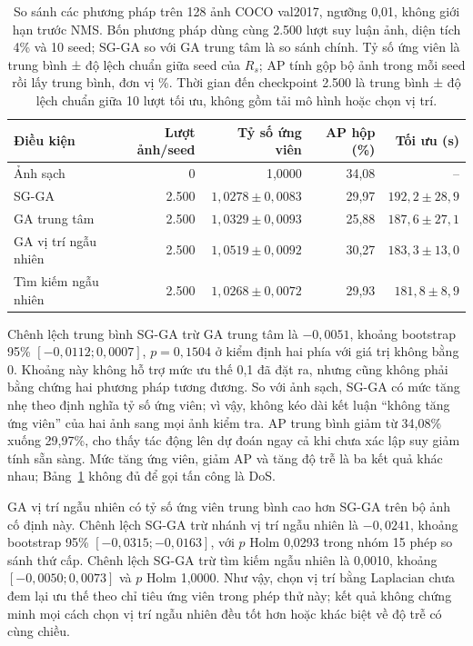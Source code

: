 \documentclass[a4paper,fleqn]{cas-dc}
\begin{document}
\begin{table}[t]
\centering
\small
\caption{So sánh các phương pháp trên 128 ảnh COCO val2017, ngưỡng 0,01, không giới hạn trước NMS. Bốn phương pháp dùng cùng 2.500 lượt suy luận ảnh, diện tích 4\% và 10 seed; SG-GA so với GA trung tâm là so sánh chính. Tỷ số ứng viên là trung bình ± độ lệch chuẩn giữa seed của $R_s$; AP tính gộp bộ ảnh trong mỗi seed rồi lấy trung bình, đơn vị \%. Thời gian đến checkpoint 2.500 là trung bình ± độ lệch chuẩn giữa 10 lượt tối ưu, không gồm tải mô hình hoặc chọn vị trí.}
\begin{tabularx}{\textwidth}{Xrrrr}
\toprule
Điều kiện & Lượt ảnh/seed & Tỷ số ứng viên & AP hộp (\%) & Tối ưu (s) \\
\midrule
Ảnh sạch & 0 & 1,0000 & 34,08 & -- \\
SG-GA & 2.500 & $1{,}0278\pm0{,}0083$ & 29,97 & $192{,}2\pm28{,}9$ \\
GA trung tâm & 2.500 & $1{,}0329\pm0{,}0093$ & 25,88 & $187{,}6\pm27{,}1$ \\
GA vị trí ngẫu nhiên & 2.500 & $1{,}0519\pm0{,}0092$ & 30,27 & $183{,}3\pm13{,}0$ \\
Tìm kiếm ngẫu nhiên & 2.500 & $1{,}0268\pm0{,}0072$ & 29,93 & $181{,}8\pm8{,}9$ \\
\bottomrule
\end{tabularx}
\label{tab:extended_primary}
\end{table}

Chênh lệch trung bình SG-GA trừ GA trung tâm là $-0{,}0051$, khoảng bootstrap 95\% $[-0{,}0112;0{,}0007]$, $p=0{,}1504$ ở kiểm định hai phía với giá trị không bằng 0. Khoảng này không hỗ trợ mức ưu thế 0,1 đã đặt ra, nhưng cũng không phải bằng chứng hai phương pháp tương đương. So với ảnh sạch, SG-GA có mức tăng nhẹ theo định nghĩa tỷ số ứng viên; vì vậy, không kéo dài kết luận “không tăng ứng viên” của hai ảnh sang mọi ảnh kiểm tra. AP trung bình giảm từ 34,08\% xuống 29,97\%, cho thấy tác động lên dự đoán ngay cả khi chưa xác lập suy giảm tính sẵn sàng. Mức tăng ứng viên, giảm AP và tăng độ trễ là ba kết quả khác nhau; Bảng~\ref{tab:extended_primary} không đủ để gọi tấn công là DoS.

GA vị trí ngẫu nhiên có tỷ số ứng viên trung bình cao hơn SG-GA trên bộ ảnh cố định này. Chênh lệch SG-GA trừ nhánh vị trí ngẫu nhiên là $-0{,}0241$, khoảng bootstrap 95\% $[-0{,}0315;-0{,}0163]$, với $p$ Holm 0,0293 trong nhóm 15 phép so sánh thứ cấp. Chênh lệch SG-GA trừ tìm kiếm ngẫu nhiên là 0,0010, khoảng $[-0{,}0050;0{,}0073]$ và $p$ Holm 1,0000. Như vậy, chọn vị trí bằng Laplacian chưa đem lại ưu thế theo chỉ tiêu ứng viên trong phép thử này; kết quả không chứng minh mọi cách chọn vị trí ngẫu nhiên đều tốt hơn hoặc khác biệt về độ trễ có cùng chiều.
\end{document}
